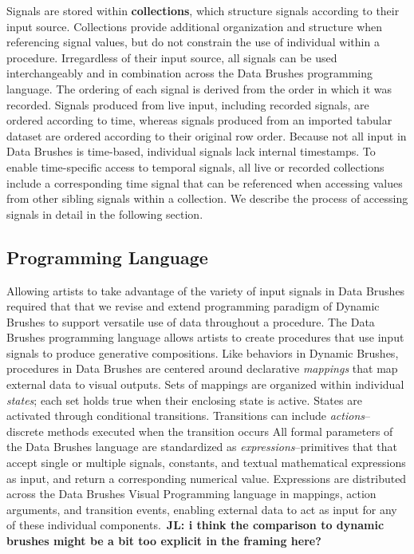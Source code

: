\documentclass{sigchi}
\newcommand {\jingyi}[1]{{\color{purple}\bf{JL: #1}\normalfont}}
\begin{document}
Signals are stored within \textbf{collections}, which structure signals according to their input source. Collections provide additional organization and structure when referencing signal values, but do not constrain the use of individual within a procedure. Irregardless of their input source, all signals can be used interchangeably and in combination across the Data Brushes programming language. The ordering of each signal is derived from the order in which it was recorded. Signals produced from live input, including recorded signals, are ordered according to time, whereas signals produced from an imported tabular dataset are ordered according to their original row order. Because not all input in Data Brushes is time-based, individual signals lack internal timestamps. To enable time-specific access to temporal signals, all live or recorded collections include a corresponding time signal that can be referenced when accessing values from other sibling signals within a collection. We describe the process of accessing signals in detail in the following section.

\subsection{Programming Language}
Allowing artists to take advantage of the variety of input signals in Data Brushes required that that we revise and extend programming paradigm of Dynamic Brushes to support versatile use of data throughout a procedure. The Data Brushes programming language allows artists to create procedures that use input signals to produce generative compositions. Like behaviors in Dynamic Brushes, procedures in Data Brushes are centered around declarative \textit{mappings} that map external data to visual outputs. Sets of mappings are organized within individual \textit{states}; each set holds true when their enclosing state is active. States are activated through conditional transitions. Transitions can include \textit{actions}-- discrete methods executed when the transition occurs 
All formal parameters of the Data Brushes language are standardized as \textit{expressions}--primitives that that accept single or multiple signals, constants, and textual mathematical expressions as input, and return a corresponding numerical value.  Expressions are distributed across the Data Brushes Visual Programming language in mappings, action arguments, and transition events, enabling external data to act as input for any of these individual components.~\jingyi{i think the comparison to dynamic brushes might be a bit too explicit in the framing here?}
\end{document}
